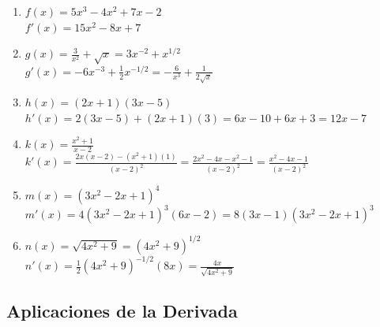 \documentclass[12pt,a4paper]{article}
\begin{document}
\begin{enumerate}
    \item $f(x) = 5x^3 - 4x^2 + 7x - 2$\\
    $f'(x) = 15x^2 - 8x + 7$
    
    \item $g(x) = \frac{3}{x^2} + \sqrt{x} = 3x^{-2} + x^{1/2}$\\
    $g'(x) = -6x^{-3} + \frac{1}{2}x^{-1/2} = -\frac{6}{x^3} + \frac{1}{2\sqrt{x}}$
    
    \item $h(x) = (2x + 1)(3x - 5)$\\
    $h'(x) = 2(3x - 5) + (2x + 1)(3) = 6x - 10 + 6x + 3 = 12x - 7$
    
    \item $k(x) = \frac{x^2 + 1}{x - 2}$\\
    $k'(x) = \frac{2x(x - 2) - (x^2 + 1)(1)}{(x - 2)^2} = \frac{2x^2 - 4x - x^2 - 1}{(x - 2)^2} = \frac{x^2 - 4x - 1}{(x - 2)^2}$
    
    \item $m(x) = (3x^2 - 2x + 1)^4$\\
    $m'(x) = 4(3x^2 - 2x + 1)^3(6x - 2) = 8(3x - 1)(3x^2 - 2x + 1)^3$
    
    \item $n(x) = \sqrt{4x^2 + 9} = (4x^2 + 9)^{1/2}$\\
    $n'(x) = \frac{1}{2}(4x^2 + 9)^{-1/2}(8x) = \frac{4x}{\sqrt{4x^2 + 9}}$
\end{enumerate}

\subsection{Aplicaciones de la Derivada}
\end{document}
